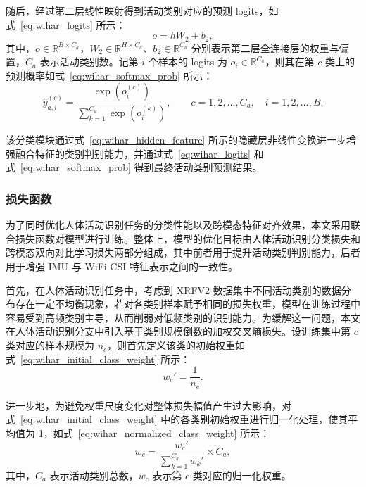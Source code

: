 随后，经过第二层线性映射得到活动类别对应的预测 logits，如式~\eqref{eq:wihar_logits} 所示：
\begin{equation}
o = hW_2+b_2,
\label{eq:wihar_logits}
\end{equation}
其中，$o \in \mathbb{R}^{B \times C_a}$，$W_2 \in \mathbb{R}^{H \times C_a}$、$b_2 \in \mathbb{R}^{C_a}$ 分别表示第二层全连接层的权重与偏置，$C_a$ 表示活动类别数。记第 $i$ 个样本的 logits 为 $o_i \in \mathbb{R}^{C_a}$，则其在第 $c$ 类上的预测概率如式~\eqref{eq:wihar_softmax_prob} 所示：
\begin{equation}
\hat{y}_{a,i}^{(c)}=\frac{\exp\!\left(o_i^{(c)}\right)}{\sum_{k=1}^{C_a}\exp\!\left(o_i^{(k)}\right)},
\qquad c=1,2,\dots,C_a,\quad i=1,2,\dots,B.
\label{eq:wihar_softmax_prob}
\end{equation}

该分类模块通过式~\eqref{eq:wihar_hidden_feature} 所示的隐藏层非线性变换进一步增强融合特征的类别判别能力，并通过式~\eqref{eq:wihar_logits} 和式~\eqref{eq:wihar_softmax_prob} 得到最终活动类别预测结果。

\subsubsection{损失函数}{}

为了同时优化人体活动识别任务的分类性能以及跨模态特征对齐效果，本文采用联合损失函数对模型进行训练。整体上，模型的优化目标由人体活动识别分类损失和跨模态双向对比学习损失两部分组成，其中前者用于提升活动类别判别能力，后者用于增强 IMU 与 WiFi CSI 特征表示之间的一致性。

首先，在人体活动识别任务中，考虑到 XRFV2 数据集中不同活动类别的数据分布存在一定不均衡现象，若对各类别样本赋予相同的损失权重，模型在训练过程中容易受到高频类别主导，从而削弱对低频类别的识别能力。为缓解这一问题，本文在人体活动识别分支中引入基于类别规模倒数的加权交叉熵损失。设训练集中第 $c$ 类对应的样本规模为 $n_c$，则首先定义该类的初始权重如式~\eqref{eq:wihar_initial_class_weight} 所示：
\begin{equation}
w_c' = \frac{1}{n_c}.
\label{eq:wihar_initial_class_weight}
\end{equation}

进一步地，为避免权重尺度变化对整体损失幅值产生过大影响，对式~\eqref{eq:wihar_initial_class_weight} 中的各类别初始权重进行归一化处理，使其平均值为 1，如式~\eqref{eq:wihar_normalized_class_weight} 所示：
\begin{equation}
w_c = \frac{w_c'}{\sum_{k=1}^{C_a} w_k'} \times C_a,
\label{eq:wihar_normalized_class_weight}
\end{equation}
其中，$C_a$ 表示活动类别总数，$w_c$ 表示第 $c$ 类对应的归一化权重。

